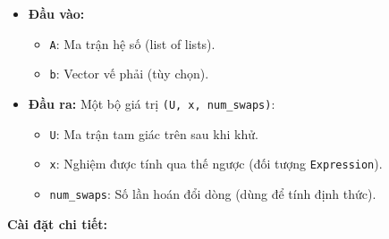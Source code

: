 \documentclass[12pt]{article}
\begin{document}
\begin{itemize}[leftmargin=1.5cm]
    \item \textbf{Đầu vào:} 
    \begin{itemize}
        \item \texttt{A}: Ma trận hệ số (list of lists).
        \item \texttt{b}: Vector vế phải (tùy chọn).
    \end{itemize}
    \item \textbf{Đầu ra:} Một bộ giá trị \texttt{(U, x, num\_swaps)}:
    \begin{itemize}
        \item \texttt{U}: Ma trận tam giác trên sau khi khử.
        \item \texttt{x}: Nghiệm được tính qua thế ngược (đối tượng \texttt{Expression}).
        \item \texttt{num\_swaps}: Số lần hoán đổi dòng (dùng để tính định thức).
    \end{itemize}
\end{itemize}

\textbf{Cài đặt chi tiết:}
\end{document}
